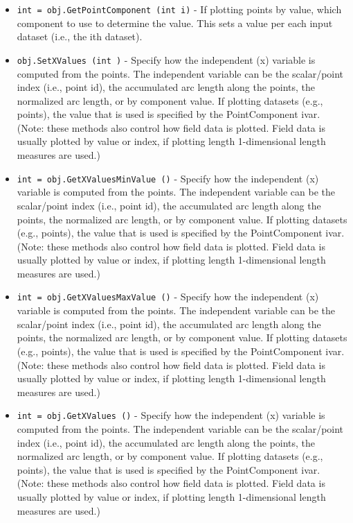\begin{itemize}
\item  \verb|int = obj.GetPointComponent (int i)| -  If plotting points by value, which component to use to determine the
 value. This sets a value per each input dataset (i.e., the ith dataset).

\item  \verb|obj.SetXValues (int )| -  Specify how the independent (x) variable is computed from the points.
 The independent variable can be the scalar/point index (i.e., point id),
 the accumulated arc length along the points, the normalized arc length,
 or by component value. If plotting datasets (e.g., points), the value
 that is used is specified by the PointComponent ivar.  (Note: these
 methods also control how field data is plotted. Field data is usually
 plotted by value or index, if plotting length 1-dimensional length
 measures are used.)

\item  \verb|int = obj.GetXValuesMinValue ()| -  Specify how the independent (x) variable is computed from the points.
 The independent variable can be the scalar/point index (i.e., point id),
 the accumulated arc length along the points, the normalized arc length,
 or by component value. If plotting datasets (e.g., points), the value
 that is used is specified by the PointComponent ivar.  (Note: these
 methods also control how field data is plotted. Field data is usually
 plotted by value or index, if plotting length 1-dimensional length
 measures are used.)

\item  \verb|int = obj.GetXValuesMaxValue ()| -  Specify how the independent (x) variable is computed from the points.
 The independent variable can be the scalar/point index (i.e., point id),
 the accumulated arc length along the points, the normalized arc length,
 or by component value. If plotting datasets (e.g., points), the value
 that is used is specified by the PointComponent ivar.  (Note: these
 methods also control how field data is plotted. Field data is usually
 plotted by value or index, if plotting length 1-dimensional length
 measures are used.)

\item  \verb|int = obj.GetXValues ()| -  Specify how the independent (x) variable is computed from the points.
 The independent variable can be the scalar/point index (i.e., point id),
 the accumulated arc length along the points, the normalized arc length,
 or by component value. If plotting datasets (e.g., points), the value
 that is used is specified by the PointComponent ivar.  (Note: these
 methods also control how field data is plotted. Field data is usually
 plotted by value or index, if plotting length 1-dimensional length
 measures are used.)


\end{itemize}
